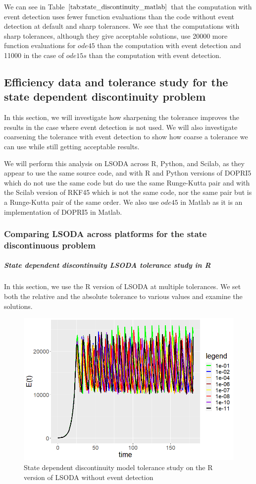 We can see in Table $\ref{tab:state_discontinuity_matlab}$ that the computation with event detection uses fewer function evaluations than the code without event detection at default and sharp tolerances. We see that the computations with sharp tolerances, although they give acceptable solutions, use 20000 more function evaluations for $ode45$ than the computation with event detection and 11000 in the case of $ode15s$ than the computation with event detection.

\subsection{Efficiency data and tolerance study for the state dependent discontinuity problem}
\label{subsection:state_tolerance_study}
In this section, we will investigate how sharpening the tolerance improves the results in the case where event detection is not used. We will also investigate coarsening the tolerance with event detection to show how coarse a tolerance we can use while still getting acceptable results.

We will perform this analysis on LSODA across R, Python, and Scilab, as they appear to use the same source code, and with R and Python versions of DOPRI5 which do not use the same code but do use the same Runge-Kutta pair and with the Scilab version of RKF45 which is not the same code, nor the same pair but is a Runge-Kutta pair of the same order. We also use $ode45$ in Matlab as it is an implementation of DOPRI5 in Matlab. 

\subsubsection{Comparing LSODA across platforms for the state discontinuous problem}
\subparagraph{State dependent discontinuity LSODA tolerance study in R}
In this section, we use the R version of LSODA at multiple tolerances. We set both the relative and the absolute tolerance to various values and examine the solutions.

\begin{figure}[h]
\centering
\includegraphics[width=0.7\linewidth]{./figures/tolerance_state_lsoda_no_event_R}
\caption{State dependent discontinuity model tolerance study on the R version of LSODA without event detection}
\label{fig:tolerance_state_lsoda_no_event_R}
\end{figure}

